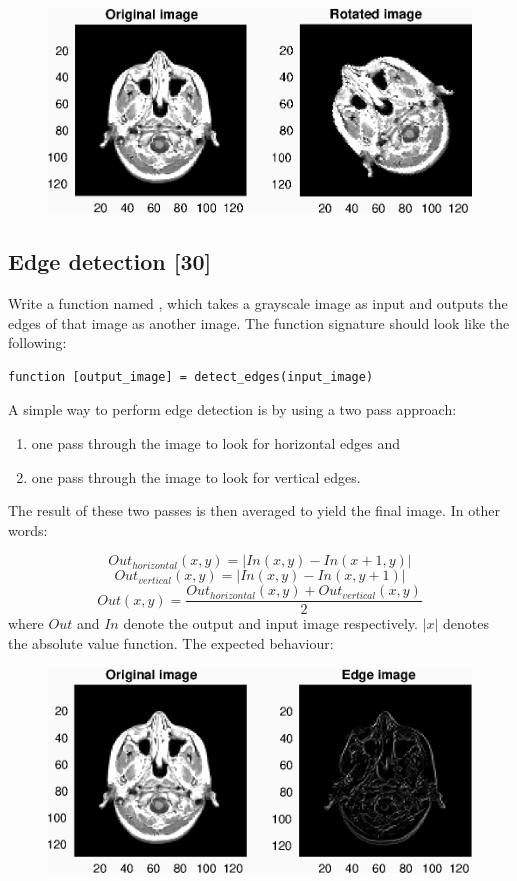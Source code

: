 \begin{figure}[H]
\centering
\includegraphics[width = .8\textwidth]{Pictures/rotate_example.eps}

\end{figure}

\subsection{Edge detection [30]}
Write a function named , which takes a grayscale image as input and outputs the edges of that image as another image. The function signature should look like the following:

\begin{minipage}{\textwidth}
\begin{lstlisting}
function [output_image] = detect_edges(input_image)
\end{lstlisting}
\end{minipage}

A simple way to perform edge detection is by using a two pass approach: 
\begin{enumerate}
	\item one pass through the image to look for horizontal edges and
	\item one pass through the image to look for vertical edges.
\end{enumerate}

The result of these two passes is then averaged to yield the final image. In other words:

$$ Out_{horizontal}(x, y) = \left|In(x, y) - In(x+1, y)\right|$$ 
$$ Out_{vertical}(x, y) = \left|In(x, y) - In(x, y+1)\right|$$
$$ Out(x,y) = \frac{Out_{horizontal}(x, y)+Out_{vertical}(x, y)}{2}$$
where $Out$ and $In$ denote the output and input image respectively. $\left| x \right|$ denotes the absolute value function.
The expected behaviour:
\begin{figure}[H]
\centering
\includegraphics[width = .8\textwidth]{Pictures/edge_detect_example.eps}

\end{figure}

